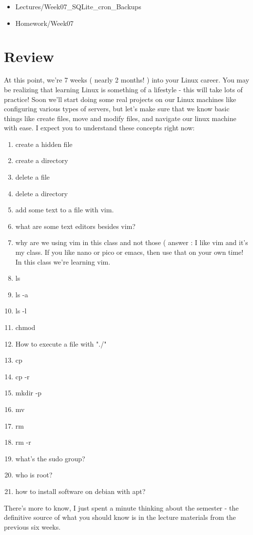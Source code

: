\documentclass[12pt,a4paper]{article}
\begin{document}
\begin{itemize}
\item Lectures/Week07\_SQLite\_cron\_Backups
\item Homework/Week07
\end{itemize}

\section{Review}

At this point, we're 7 weeks ( nearly 2 months! ) into your Linux career. You
may be realizing that learning Linux is something of a lifestyle - this will
take lots of practice! Soon we'll start doing some real projects on our Linux
machines like configuring various types of servers, but let's make sure that we
know basic things like create files, move and modify files, and navigate our
linux machine with ease.
 I expect you to understand these concepts right
now:

\begin{multicols}{2}
\begin{enumerate}
\setlength\itemsep{0em}
\item create a hidden file
\item create a directory
\item delete a file
\item delete a directory
\item add some text to a file with vim.
\item what are some text editors besides vim?
\item why are we using vim in this class and not those ( answer : I like vim and
it's my class. If you like nano or pico or emacs, then use that on your own
time! In this class we're learning vim.
\item ls
\item ls -a
\item ls -l
\item chmod
\item How to execute a file with "./"
\item cp
\item cp -r
\item mkdir -p
\item mv
\item rm 
\item rm -r
\item what's the sudo group?
\item who is root?
\item how to install software on debian with apt?
\end{enumerate}
\end{multicols}
There's more to know, I just spent a minute thinking about the semester - the
definitive source of what you should know is in the lecture materials from the
previous six weeks.
\end{document}
